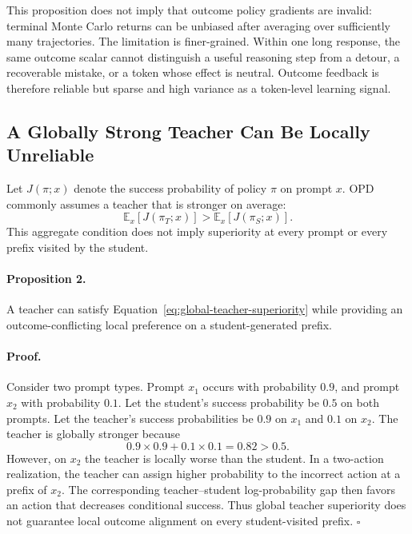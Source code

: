 This proposition does not imply that outcome policy gradients are invalid: terminal Monte Carlo returns can be unbiased after averaging over sufficiently many trajectories. The limitation is finer-grained. Within one long response, the same outcome scalar cannot distinguish a useful reasoning step from a detour, a recoverable mistake, or a token whose effect is neutral. Outcome feedback is therefore reliable but sparse and high variance as a token-level learning signal.

\subsection{A Globally Strong Teacher Can Be Locally Unreliable}

Let $J(\pi;x)$ denote the success probability of policy $\pi$ on prompt $x$. OPD commonly assumes a teacher that is stronger on average:
\begin{equation}
\mathbb{E}_{x}[J(\pi_T;x)]>
\mathbb{E}_{x}[J(\pi_S;x)].
\label{eq:global-teacher-superiority}
\end{equation}
This aggregate condition does not imply superiority at every prompt or every prefix visited by the student.

\paragraph{Proposition 2.}
A teacher can satisfy Equation~\eqref{eq:global-teacher-superiority} while providing an outcome-conflicting local preference on a student-generated prefix.

\paragraph{Proof.}
Consider two prompt types. Prompt $x_1$ occurs with probability $0.9$, and prompt $x_2$ with probability $0.1$. Let the student's success probability be $0.5$ on both prompts. Let the teacher's success probabilities be $0.9$ on $x_1$ and $0.1$ on $x_2$. The teacher is globally stronger because
\begin{equation}
0.9\times0.9+0.1\times0.1=0.82>0.5.
\end{equation}
However, on $x_2$ the teacher is locally worse than the student. In a two-action realization, the teacher can assign higher probability to the incorrect action at a prefix of $x_2$. The corresponding teacher--student log-probability gap then favors an action that decreases conditional success. Thus global teacher superiority does not guarantee local outcome alignment on every student-visited prefix. \hfill $\square$

